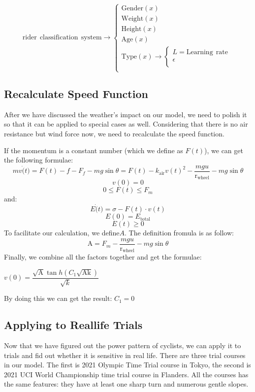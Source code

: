 \documentclass{article}
\begin{document}
			\[\boxed{\mathrm{rider\:\:classification\:\:system}} \rightarrow \begin{cases}
				\mathrm{Gender}\left( x \right)\\
				\mathrm{Weight}\left( x \right)\\
				\mathrm{Height}\left( x \right)\\
				\mathrm{Age}\left( x \right)\\
				\mathrm{Type}\left( x \right) \rightarrow \begin{cases}
				L=\mathrm{Learning}\:\:\mathrm{rate}\\
				\epsilon\\
			\end{cases}\\
			\end{cases}\]

		\subsection{Recalculate Speed Function}
		After we have discussed the weather's impact on our model, we need to polish it so that it can be applied to special cases as well. Considering that there is no air resistance but wind force now, we need to recalculate the speed function.

		If the momentum is a constant number (which we define as $F(t)$), we can get the following formulae:
		$$mv\dot(t)=F(t)-f-F_{f}-mg\sin \theta=F(t)- k _\mathrm{air}{v(t)}^2-\dfrac{mgu}{\mathrm{r}_\mathrm{wheel}}-mg\sin \theta$$
		$$v(0)=0$$
		$$0\leq F(t)\leq F_{m}$$
		and:
		$$ E \dot(t)=\sigma-F(t)\cdot v(t)$$
		$$ E (0)= E _\mathrm{total}$$
		$$ E (t)\geq0$$
		To facilitate our calculation, we define$A$. The definition fromula is as follow:
		$$\mathrm{A}=F_m-\dfrac{mgu}{\mathrm{r}_\mathrm{wheel}}-mg\sin \theta$$
		Finally, we combine all the factors together and get the formulae:

		\begin{footnotesize}

		\end{footnotesize}

		$v(0)=\dfrac{\sqrt{\mathrm{A}} \tan h \left( C _1\sqrt{\mathrm{Ak}}\right)}{\sqrt{ k }}$

		By doing this we can get the result: $ C _1=0$
		\subsection{Applying to Reallife Trials}
		Now that we have figured out the power pattern of cyclists, we can apply it to trials and fid out whether it is sensitive in real life. There are three trial courses in our model. The first is 2021 Olympic Time Trial course in Tokyo, the second is 2021 UCI World Championship time trial course in Flanders. All the courses has the same features: they have at least one sharp turn and numerous gentle slopes.
\end{document}
